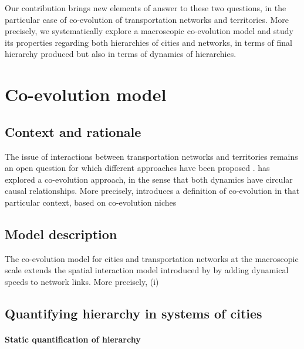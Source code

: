 \documentclass[english,fleqn,allpages]{ISTE_science}[2018/07/30]
\begin{document}
Our contribution brings new elements of answer to these two questions, in the particular case of co-evolution of transportation networks and territories. More precisely, we systematically explore a macroscopic co-evolution model and study its properties regarding both hierarchies of cities and networks, in terms of final hierarchy produced but also in terms of dynamics of hierarchies.


\section{Co-evolution model}

\subsection{Context and rationale}

The issue of interactions between transportation networks and territories remains an open question for which different approaches have been proposed \cite{offner1993effets,espacegeo2014effets}. \cite{raimbault2018caracterisation} has explored a co-evolution approach, in the sense that both dynamics have circular causal relationships. More precisely, \cite{raimbault2019modeling} introduces a definition of co-evolution in that particular context, based on co-evolution niches \cite{holland2012signals}

\cite{raimbault2018modeling}

\subsection{Model description}

The co-evolution model for cities and transportation networks at the macroscopic scale extends the spatial interaction model introduced by \cite{raimbault2018indirect} by adding dynamical speeds to network links. More precisely, (i)  



\subsection{Quantifying hierarchy in systems of cities}


\paragraph{Static quantification of hierarchy}
\end{document}
